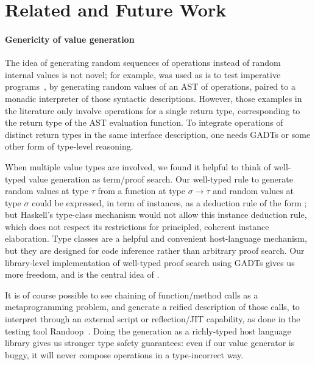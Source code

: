 \section{Related and Future Work}

\paragraph{Genericity of value generation}

The idea of generating random sequences of operations instead of
random internal values is not novel; for example, \qcheck was used as
is to test imperative
programs~\cite{DBLP:journals/sigplan/ClaessenH02}, by generating
random values of an AST of operations, paired to a monadic interpreter
of those syntactic descriptions. However, those examples in the
literature only involve operations for a single return type,
corresponding to the return type of the AST evaluation function. To
integrate operations of distinct return types in the same interface
description, one needs GADTs or some other form of type-level
reasoning.

When multiple value types are involved, we found it helpful to think
of well-typed value generation as term/proof search. Our well-typed
rule to generate random values at type $\tau$ from a function at type
$\sigma \to \tau$ and random values at type $\sigma$ could be
expressed, in term of \qcheck {} instances, as
a deduction rule of the form ; but Haskell's type-class
mechanism would not allow this instance deduction rule, which does not
respect its restrictions for principled, coherent instance
elaboration. Type classes are a helpful and convenient host-language
mechanism, but they are designed for code inference rather than
arbitrary proof search. Our library-level implementation of well-typed
proof search using GADTs gives us more freedom, and is the central
idea of .

It is of course possible to see chaining of function/method calls as
a metaprogramming problem, and generate a reified description of those
calls, to interpret through an external script or reflection/JIT
capability, as done in the testing tool
Randoop~\cite{DBLP:conf/oopsla/PachecoE07}. Doing the generation as
a richly-typed host language library gives us stronger type safety
guarantees: even if our value generator is buggy, it will never
compose operations in a type-incorrect way.


